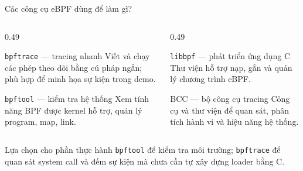\begin{frame}{Các công cụ eBPF dùng để làm gì?}
  \begin{columns}[T,onlytextwidth]
    \begin{column}{0.49\textwidth}
      \begin{block}{\texttt{bpftrace} — tracing nhanh}
        Viết và chạy các phép theo dõi bằng cú pháp ngắn; phù hợp để
        minh họa sự kiện trong demo.
      \end{block}
      \begin{block}{\texttt{bpftool} — kiểm tra hệ thống}
        Xem tính năng BPF được kernel hỗ trợ, quản lý program, map, link.
      \end{block}
    \end{column}
    \begin{column}{0.49\textwidth}
      \begin{block}{\texttt{libbpf} — phát triển ứng dụng C}
        Thư viện hỗ trợ nạp, gắn và quản lý chương trình eBPF.
      \end{block}
      \begin{block}{BCC — bộ công cụ tracing}
        Công cụ và thư viện để quan sát, phân tích hành vi và hiệu năng hệ thống.
      \end{block}
    \end{column}
  \end{columns}
  \vspace{0.12cm}
  \begin{alertblock}{Lựa chọn cho phần thực hành}
    \texttt{bpftool} để kiểm tra môi trường; \texttt{bpftrace} để quan sát
    system call và đếm sự kiện mà chưa cần tự xây dựng loader bằng C.
  \end{alertblock}
\end{frame}

